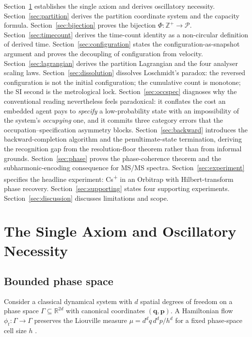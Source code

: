 \documentclass[twocolumn,10pt,a4paper]{article}
\theoremstyle{thmstyle}
\theoremstyle{definition}
\theoremstyle{remark}
\newcommand{\R}{\mathbb{R}}
\newcommand{\Zp}{\mathbb{Z}^{+}}
\newcommand{\Parts}{\mathcal{P}}
\newcommand{\PhiMap}{\varPhi}
\begin{document}
Section~\ref{sec:axiom} establishes the single axiom and derives
oscillatory necessity. Section~\ref{sec:partition} derives the
partition coordinate system and the capacity formula.
Section~\ref{sec:bijection} proves the bijection $\PhiMap:\Zp\to\Parts$.
Section~\ref{sec:timecount} derives the time-count identity as a
non-circular definition of derived time.
Section~\ref{sec:configuration} states the configuration-as-snapshot
argument and proves the decoupling of configuration from velocity.
Section~\ref{sec:lagrangian} derives the partition Lagrangian and the
four analyser scaling laws.
Section~\ref{sec:dissolution} dissolves Loschmidt's paradox: the
reversed configuration is not the initial configuration; the
cumulative count is monotone; the SI second is the metrological lock.
Section~\ref{sec:occspec} diagnoses why the conventional reading
nevertheless feels paradoxical: it conflates the cost an embedded
agent pays to \emph{specify} a low-probability state with an
impossibility of the system's \emph{occupying} one, and it commits
three category errors that the occupation--specification asymmetry
blocks.
Section~\ref{sec:backward} introduces the backward-completion algorithm
and the penultimate-state termination, deriving the recognition gap
from the resolution-floor theorem rather than from informal grounds.
Section~\ref{sec:phase} proves the phase-coherence theorem and the
subharmonic-encoding consequence for MS/MS spectra.
Section~\ref{sec:experiment} specifies the headline experiment:
Cs\textsuperscript{+} in an Orbitrap with Hilbert-transform phase
recovery.
Section~\ref{sec:supporting} states four supporting experiments.
Section~\ref{sec:discussion} discusses limitations and scope.

\section{The Single Axiom and Oscillatory Necessity}
\label{sec:axiom}

\subsection{Bounded phase space}

Consider a classical dynamical system with $d$ spatial degrees of
freedom on a phase space $\Gamma\subseteq\R^{2d}$ with canonical
coordinates $(\mathbf{q},\mathbf{p})$. A Hamiltonian flow
$\phi_{t}:\Gamma\to\Gamma$ preserves the Liouville measure
$\mu=d^{d}q\,d^{d}p/h^{d}$ for a fixed phase-space cell size $h$
\citep{arnold1989}.
\end{document}
